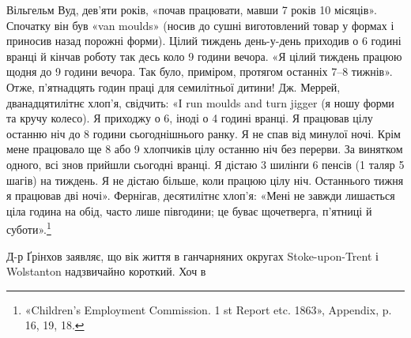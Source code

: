 Вільгельм Вуд, дев’яти років, «почав працювати, мавши
7 років 10 місяців». Спочатку він був «van moulds» (носив до
сушні виготовлений товар у формах і приносив назад порожні
форми). Цілий тиждень день-у-день приходив о 6 годині вранці
й кінчав роботу так десь коло 9 години вечора. «Я цілий тиждень
працюю щодня до 9 години вечора. Так було, приміром, протягом
останніх 7--8 тижнів». Отже, п’ятнадцять годин праці для семилітньої
дитини! Дж. Меррей, дванадцятилітнє хлоп’я, свідчить:
«І run moulds and turn jigger (я ношу форми та кручу колесо).
Я приходжу о 6, іноді о 4 годині вранці. Я працював цілу останню
ніч до 8 години сьогоднішнього ранку. Я не спав від минулої
ночі. Крім мене працювало ще 8 або 9 хлопчиків цілу останню
ніч без перерви. За винятком одного, всі знов прийшли сьогодні
вранці. Я дістаю 3 шилінґи 6 пенсів (1 таляр 5 шагів) на тиждень.
Я не дістаю більше, коли працюю цілу ніч. Останнього тижня
я працював дві ночі». Фернігав, десятилітнє хлоп’я: «Мені не
завжди лишається ціла година на обід, часто лише півгодини;
це буває щочетверга, п’ятниці й суботи».\footnote{«Children’s Employment Commission. 1 st Report etc. 1863», Appendix,
p. 16, 19, 18.
}

Д-р Ґрінхов заявляє, що вік життя в ганчарняних округах
Stoke-upon-Trent і Wolstanton надзвичайно короткий. Хоч в
\parbreak{}  %
